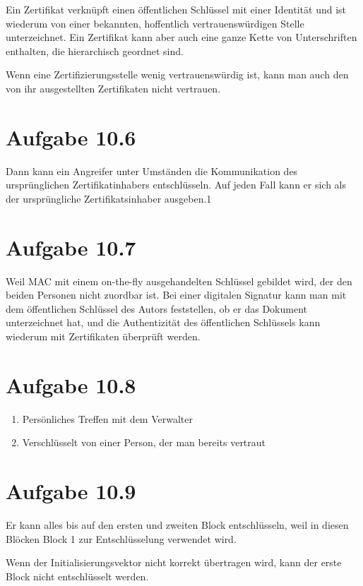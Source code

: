 \documentclass[10pt,a4paper]{article}
\begin{document}
Ein Zertifikat verknüpft einen öffentlichen Schlüssel mit einer Identität und
ist wiederum von einer bekannten, hoffentlich vertrauenswürdigen Stelle
unterzeichnet. Ein Zertifikat kann aber auch eine ganze Kette von Unterschriften
enthalten, die hierarchisch geordnet sind.

Wenn eine Zertifizierungsstelle wenig vertrauenswürdig ist, kann man auch den
von ihr ausgestellten Zertifikaten nicht vertrauen.

\section{Aufgabe 10.6}

Dann kann ein Angreifer unter Umständen die Kommunikation des ursprünglichen
Zertifikatinhabers entschlüsseln. Auf jeden Fall kann er sich als der
ursprüngliche Zertifikatsinhaber ausgeben.1

\section{Aufgabe 10.7}

Weil MAC mit einem on-the-fly ausgehandelten Schlüssel gebildet wird, der den
beiden Personen nicht zuordbar ist. Bei einer digitalen Signatur kann man mit
dem öffentlichen Schlüssel des Autors feststellen, ob er das Dokument
unterzeichnet hat, und die Authentizität des öffentlichen Schlüssels kann
wiederum mit Zertifikaten überprüft werden.

\section{Aufgabe 10.8}

\begin{enumerate}[label={\alph*)}]
\item Persönliches Treffen mit dem Verwalter
\item Verschlüsselt von einer Person, der man bereits vertraut
\end{enumerate}

\section{Aufgabe 10.9}

Er kann alles bis auf den ersten und zweiten Block entschlüsseln, weil in diesen
Blöcken Block 1 zur Entschlüsselung verwendet wird.

Wenn der Initialisierungsvektor nicht korrekt übertragen wird, kann der erste
Block nicht entschlüsselt werden.
\end{document}

